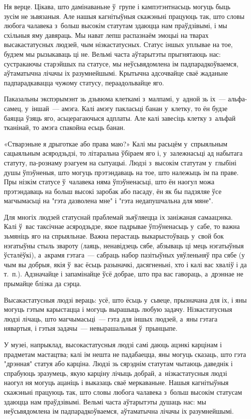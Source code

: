 Ня верце. Цікава, што дамінаваньне ў~групе і кампэтэнтнасьць могуць быць зусім не зьвязаныя. Але нашыя кагнітыўныя скажэньні працуюць так, што словы любога чалавека з~больш высокім статутам здаюцца нам праўдзівымі, і мы схільныя яму давяраць. Мы нават лепш распазнаём эмоцыі на тварах высакастатусных людзей, чым нізкастатусных. Статус іншых уплывае на тое, будзем мы рызыкаваць ці не. Вельмі часта аўтарытэты прыгнятаюць нас: сустракаючы старэйшых па статусе, мы неўсьвядомлена ім падпарадкоўваемся, аўтаматычна лічачы іх разумнейшымі. Крытычна адсочвайце сваё жаданьне падпарадкавацца чужому статусу, пераадольвайце яго.

Паказальны экспэрымэнт зь дзьвюма клеткамі з~малпамі, у~адной зь іх~--- альфа-самец, у~іншай~--- амэга. Калі амэгу пакласьці банан у~клетку, то ён будзе баяцца ўзяць яго, асьцерагаючыся адплаты. Але калі завесіць клетку з~альфай тканінай, то амэга спакойна есьць банан.

«Стварэньне я дрыготкае або права маю?» Калі мы расьцём у~спрыяльным сацыяльным асяродзьдзі, то літаральна ўбіраем яго і, у~залежнасьці ад набытага статуту, па-рознаму рэагуем на сытуацыі. Людзі з~высокім статутам у~глыбіні душы ўпэўненыя, што могуць прэтэндаваць на тое, што належыць ім па праве. Пры нізкім статусе ў~чалавека няма ўпэўненасьці, што ён наогул можа прэтэндаваць на больш высокі заробак або пасаду, ён як бы падзяляе ўсе магчымасьці на "гэта дазволена мне" і "гэта недапушчальна для мяне".

Для многіх людзей статуснай праблемай зьяўляецца іх заніжаная самаацэнка. Калі ў~вас таксічнае асяродзьдзе, якое падрывае ўпэўненасьць у~сабе, то важна зьмяніць яго на спрыяльнае. Важна перастаць выкарыстоўваць у~свой бок нэгатыўны стыль звароту (лаяць, ненавідзець сябе, абзываць ці мець нэгатыўныя ўсталёўкі), а~акрамя гэтага~--- сабраць набор пазітыўных уяўленьняў пра сябе (у чым вы добрыя, якія ў~вас ёсьць разыначкі, дасягненьні, хто і калі вас хваліў і да т.~п.). Адзначайце і запамінайце ўсё добрае, што пра вас гавораць, а~дрэннае не прымайце блізка да сэрца.

Высакастатусныя людзі вераць: усё, што ёсьць у~сьвеце, прызначана для іх, і яны могуць гэтым карыстацца і могуць вырашыць любую задачу. Нізкастатусныя людзі лічаць, што магчымасьці~--- гэта для іншых людзей, а~яны гэтага нявартыя, і гэтыя задачы~--- невырашальныя ў~прынцыпе.

У музеі, напрыклад, высокастатусныя людзі самі даюць ацэнкі карцінам і прадметам мастацтва; калі ім нешта не падабаецца, яны могуць сказаць, што гэта "дрэнная" статуя або карціна. Людзі зь сярэднім статутам чытаюць даведнік і спрабуюць зразумець, якую карціну лічыць добрай, а~нізкастатусныя людзі наогул ня могуць ацаніць і выказаць сваё меркаваньне. Нашыя кагнітыўныя скажэньні працуюць так, што словы любога чалавека з~больш высокім статусам здаюцца нам праўдзівымі. Вельмі часта аўтарытэты душаць нас: мы неўсьвядомлена ім падпарадкоўваемся, аўтаматычна лічачы іх разумнейшымі.

